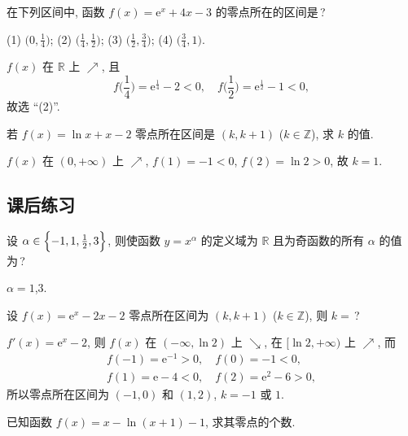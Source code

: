   \begin{exercise}
    在下列区间中, 函数 $f(x)=\mathrm{e}^x +4x-3$ 
    的零点所在的区间是\,?
    
    (1) $\Big(0,\frac14\Big)$;\qquad
    (2) $\Big(\frac14,\frac12\Big)$;\qquad
    (3) $\Big(\frac12,\frac34\Big)$;\qquad
    (4) $\Big(\frac34,1\Big)$.
  \end{exercise}

  \beginsolution
    $f(x)$ 在 $\mathbb{R}$ 上 $\nearrow$, 且 
    \[f\Big(\frac14\Big)=\mathrm{e}^{\frac14}-2<0,\quad
      f\Big(\frac12\Big)=\mathrm{e}^{\frac12}-1<0,\]
    故选 ``(2)''.
  \endsolution
  
  \begin{exercise}
    若 $f(x)=\ln x+x-2$ 零点所在区间是 $(k,k+1)$ ($k\in\mathbb{Z}$),
    求 $k$ 的值.
  \end{exercise}

  \beginsolution
    $f(x)$ 在 $(0,+\infty)$ 上 $\nearrow$, $f(1)=-1<0$, $f(2)=\ln2>0$, 故 $k=1$.
  \endsolution
  
  \subsection{课后练习}
  \begin{exercise}
    设 $\alpha\in \Bigl\{-1,1,\frac12,3\Bigr\}$, 
    则使函数 $y=x^\alpha$ 的定义域为 $\mathbb{R}$ 
    且为奇函数的所有 $\alpha$ 的值为\,?
  \end{exercise}

  \beginsolution
    $\alpha=1$,$3$.
  \endsolution
  
  \begin{exercise}
    设 $f(x)=\mathrm{e}^x -2x-2$ 零点所在区间为 $(k,k+1)$ 
    ($k\in\mathbb{Z}$), 则 $k=$\,?
  \end{exercise}

  \beginsolution
    $f'(x)=\mathrm{e}^x-2$, 则 $f(x)$ 在 $(-\infty,\ln2)$ 上 $\searrow$, 在 $[\ln2,+\infty)$ 上 $\nearrow$, 而
    \begin{gather*}
      f(-1)=\mathrm{e}^{-1}>0,\quad f(0)=-1<0,\\
      f(1)=\mathrm{e}-4<0,\quad f(2)=\mathrm{e}^2-6>0,
    \end{gather*}
    所以零点所在区间为 $(-1,0)$ 和 $(1,2)$, $k=-1$ 或 $1$.
  \endsolution
  
  \begin{exercise}
    已知函数 $f(x)=x-\ln(x+1)-1$, 求其零点的个数.
  \end{exercise}


